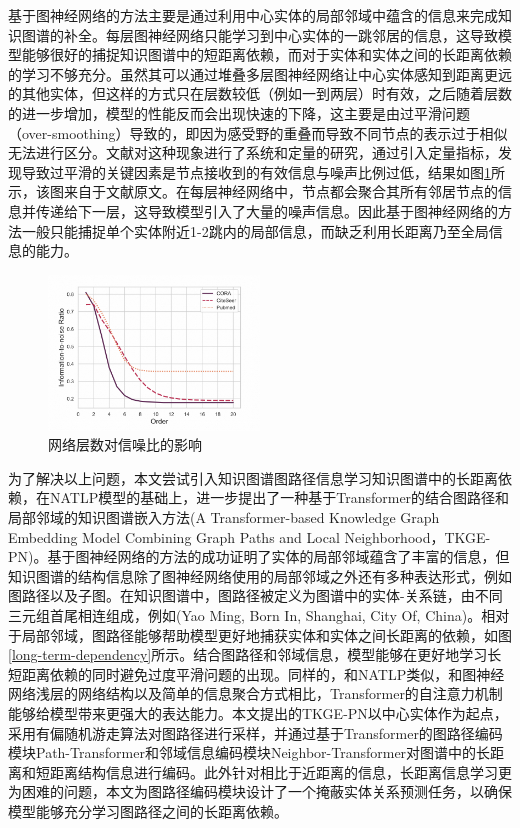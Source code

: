 基于图神经网络的方法主要是通过利用中心实体的局部邻域中蕴含的信息来完成知识图谱的补全。每层图神经网络只能学习到中心实体的一跳邻居的信息，这导致模型能够很好的捕捉知识图谱中的短距离依赖，而对于实体和实体之间的长距离依赖的学习不够充分。虽然其可以通过堆叠多层图神经网络让中心实体感知到距离更远的其他实体，但这样的方式只在层数较低（例如一到两层）时有效，之后随着层数的进一步增加，模型的性能反而会出现快速的下降，这主要是由过平滑问题（over-smoothing）导致的，即因为感受野的重叠而导致不同节点的表示过于相似无法进行区分。文献\cite{over-smoothing}对这种现象进行了系统和定量的研究，通过引入定量指标，发现导致过平滑的关键因素是节点接收到的有效信息与噪声比例过低，结果如图\ref{information-noise}所示，该图来自于文献\cite{over-smoothing}原文。在每层神经网络中，节点都会聚合其所有邻居节点的信息并传递给下一层，这导致模型引入了大量的噪声信息。因此基于图神经网络的方法一般只能捕捉单个实体附近1-2跳内的局部信息，而缺乏利用长距离乃至全局信息的能力。
\begin{figure}[htb]
  \centerline{\includegraphics[width=0.5\textwidth]{pic/information-noise.png}}
  \caption{网络层数对信噪比的影响}
  \label{information-noise}
\end{figure}

为了解决以上问题，本文尝试引入知识图谱图路径信息学习知识图谱中的长距离依赖，在NATLP模型的基础上，进一步提出了一种基于Transformer的结合图路径和局部邻域的知识图谱嵌入方法(A Transformer-based Knowledge Graph Embedding Model Combining Graph Paths and Local Neighborhood，TKGE-PN)。基于图神经网络的方法的成功证明了实体的局部邻域蕴含了丰富的信息，但知识图谱的结构信息除了图神经网络使用的局部邻域之外还有多种表达形式，例如图路径以及子图。在知识图谱中，图路径被定义为图谱中的实体-关系链，由不同三元组首尾相连组成，例如(Yao Ming, Born In, Shanghai, City Of, China)。相对于局部邻域，图路径能够帮助模型更好地捕获实体和实体之间长距离的依赖，如图\ref{long-term-dependency}所示。结合图路径和邻域信息，模型能够在更好地学习长短距离依赖的同时避免过度平滑问题的出现。同样的，和NATLP类似，和图神经网络浅层的网络结构以及简单的信息聚合方式相比，Transformer的自注意力机制能够给模型带来更强大的表达能力。本文提出的TKGE-PN以中心实体作为起点，采用有偏随机游走算法对图路径进行采样，并通过基于Transformer的图路径编码模块Path-Transformer和邻域信息编码模块Neighbor-Transformer对图谱中的长距离和短距离结构信息进行编码。此外针对相比于近距离的信息，长距离信息学习更为困难的问题，本文为图路径编码模块设计了一个掩蔽实体关系预测任务，以确保模型能够充分学习图路径之间的长距离依赖。


